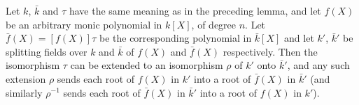 Let $k$, $\bar{k}$ and $\tau$ have the same meaning as in the preceding lemma, and let $f(X)$ be an arbitrary monic polynomial in $k[X]$, of degree $n$. Let $\bar{f}(X) = [f(X)]\tau$ be the corresponding polynomial in $\bar{k}[X]$ and let $k'$, $\bar{k}'$ be splitting fields over $k$ and $\bar{k}$ of $f(X)$ and $\bar{f}(X)$ respectively. Then the isomorphism $\tau$ can be extended to an isomorphism $\rho$ of $k'$ onto $\bar{k}'$, and any such extension $\rho$ sends each root of $f(X)$ in $k'$ into a root of $\bar{f}(X)$ in $\bar{k}'$ (and similarly $\rho^{-1}$ sends each root of $\bar{f}(X)$ in $\bar{k}'$ into a root of $f(X)$ in $k'$).

